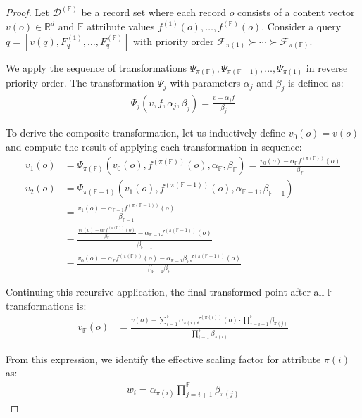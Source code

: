 \documentclass[numbers,sort]{article}
\begin{document}
\begin{proof}
Let $\mathcal{D}^{(\mathbb{F})}$ be a record set where each record $o$ consists of a content vector $v(o) \in \mathbb{R}^d$ and $\mathbb{F}$ attribute values $f^{(1)}(o), \ldots, f^{(\mathbb{F})}(o)$. Consider a query $q = [v(q), F^{(1)}_q, \ldots, F^{(\mathbb{F})}_q]$ with priority order $\mathcal{F}_{\pi(1)} \succ \cdots \succ \mathcal{F}_{\pi(\mathbb{F})}$.

We apply the sequence of transformations $\Psi_{\pi(\mathbb{F})}, \Psi_{\pi(\mathbb{F}-1)}, \ldots, \Psi_{\pi(1)}$ in reverse priority order. The transformation $\Psi_j$ with parameters $\alpha_j$ and $\beta_j$ is defined as:
\begin{align}
\Psi_j(v, f, \alpha_j, \beta_j) = \frac{v - \alpha_j f}{\beta_j}
\end{align}

To derive the composite transformation, let us inductively define $v_0(o) = v(o)$ and compute the result of applying each transformation in sequence:
\begin{align}
v_1(o) &= \Psi_{\pi(\mathbb{F})}(v_0(o), f^{(\pi(\mathbb{F}))}(o), \alpha_{\mathbb{F}}, \beta_{\mathbb{F}}) = \frac{v_0(o) - \alpha_{\mathbb{F}} f^{(\pi(\mathbb{F}))}(o)}{\beta_{\mathbb{F}}} \\
v_2(o) &= \Psi_{\pi(\mathbb{F}-1)}(v_1(o), f^{(\pi(\mathbb{F}-1))}(o), \alpha_{\mathbb{F}-1}, \beta_{\mathbb{F}-1}) \\
&= \frac{v_1(o) - \alpha_{\mathbb{F}-1} f^{(\pi(\mathbb{F}-1))}(o)}{\beta_{\mathbb{F}-1}} \\
&= \frac{\frac{v_0(o) - \alpha_{\mathbb{F}} f^{(\pi(\mathbb{F}))}(o)}{\beta_{\mathbb{F}}} - \alpha_{\mathbb{F}-1} f^{(\pi(\mathbb{F}-1))}(o)}{\beta_{\mathbb{F}-1}} \\
&= \frac{v_0(o) - \alpha_{\mathbb{F}} f^{(\pi(\mathbb{F}))}(o) - \alpha_{\mathbb{F}-1} \beta_{\mathbb{F}} f^{(\pi(\mathbb{F}-1))}(o)}{\beta_{\mathbb{F}-1} \beta_{\mathbb{F}}}
\end{align}

Continuing this recursive application, the final transformed point after all $\mathbb{F}$ transformations is:
\begin{align}
v_{\mathbb{F}}(o) &= \frac{v(o) - \sum_{i=1}^{\mathbb{F}} \alpha_{\pi(i)} f^{(\pi(i))}(o) \cdot \prod_{j=i+1}^{\mathbb{F}} \beta_{\pi(j)}}{\prod_{i=1}^{\mathbb{F}} \beta_{\pi(i)}}
\end{align}

From this expression, we identify the effective scaling factor for attribute $\pi(i)$ as:
\begin{align}
w_i = \alpha_{\pi(i)} \prod_{j=i+1}^{\mathbb{F}} \beta_{\pi(j)}
\end{align}


\end{proof}
\end{document}
